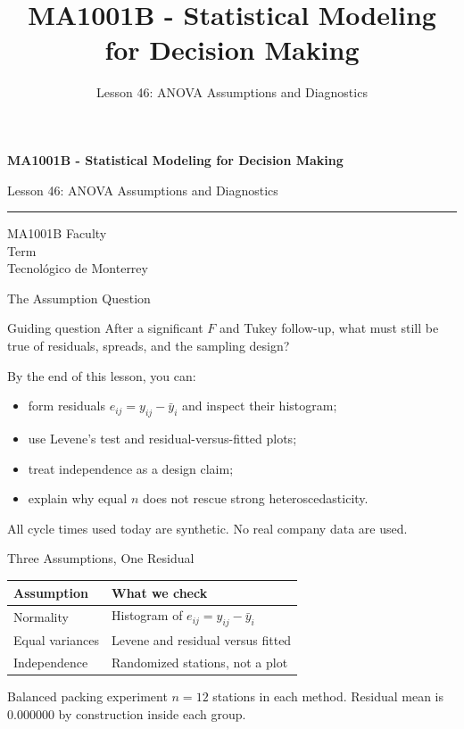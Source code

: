 \documentclass[aspectratio=169,10pt,english]{beamer}
\title{MA1001B - Statistical Modeling for Decision Making}
\subtitle{Lesson 46: ANOVA Assumptions and Diagnostics}
\author{}
\institute{Tecnol\'ogico de Monterrey}
\date{}
\begin{document}
\begin{frame}[plain]
  \vspace{1.2cm}
  {\Large\bfseries MA1001B - Statistical Modeling for Decision Making\par}
  \vspace{0.7cm}
  {\large Lesson 46: ANOVA Assumptions and Diagnostics\par}
  \vspace{0.7cm}
  {\color{TecRojo}\rule{\textwidth}{1.2pt}}
  \vspace{0.8cm}

  MA1001B Faculty\\[0.3cm]
  Term\\[0.3cm]
  Tecnol\'ogico de Monterrey
\end{frame}

\begin{frame}{The Assumption Question}
  \begin{alertblock}{Guiding question}
    After a significant $F$ and Tukey follow-up, what must still be true of
    residuals, spreads, and the sampling design?
  \end{alertblock}

  \vspace{0.6em}
  By the end of this lesson, you can:
  \begin{itemize}
    \item form residuals $e_{ij}=y_{ij}-\bar y_i$ and inspect their histogram;
    \item use Levene's test and residual-versus-fitted plots;
    \item treat independence as a design claim;
    \item explain why equal $n$ does not rescue strong heteroscedasticity.
  \end{itemize}

  \vfill
  \scriptsize All cycle times used today are synthetic. No real company data are used.
\end{frame}

\begin{frame}{Three Assumptions, One Residual}
  \small
  \begin{center}
    \begin{tabular}{ll}
      \toprule
      \textbf{Assumption} & \textbf{What we check} \\
      \midrule
      Normality & Histogram of $e_{ij}=y_{ij}-\bar y_i$ \\
      Equal variances & Levene and residual versus fitted \\
      Independence & Randomized stations, not a plot \\
      \bottomrule
    \end{tabular}
  \end{center}

  \vspace{0.5em}
  \begin{exampleblock}{Balanced packing experiment}
    $n=12$ stations in each method. Residual mean is $0.000000$ by
    construction inside each group.
  \end{exampleblock}
\end{frame}
\end{document}
